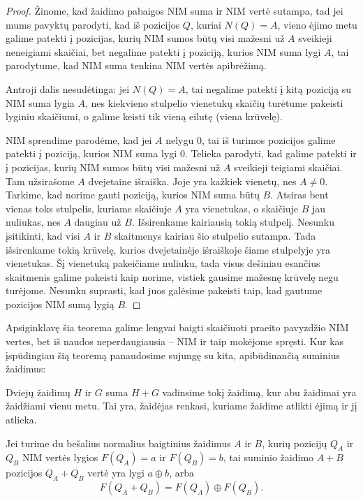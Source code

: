\begin{proof}
  Žinome, kad žaidimo pabaigos NIM suma ir NIM vertė sutampa, tad jei mums
  pavyktų parodyti, kad iš pozicijos $Q$, kuriai $N(Q)=A$, vieno ėjimo metu
  galime patekti į pozicijas, kurių NIM sumos būtų visi mažesni už $A$
  sveikieji neneigiami skaičiai, bet negalime patekti į poziciją, kurios NIM
  suma lygi $A$, tai parodytume, kad NIM suma tenkina NIM vertės apibrėžimą.

  Antroji dalis nesudėtinga: jei $N(Q)=A$, tai negalime patekti į kitą
  poziciją su NIM suma lygia $A$, nes kiekvieno stulpelio vienetukų skaičių
  turėtume pakeisti lyginiu skaičiumi, o galime keisti tik vieną eilutę
  (viena krūvelę).

  NIM sprendime parodėme, kad jei $A$ nelygu $0$, tai iš turimos pozicijos galime
  patekti į poziciją, kurios NIM suma lygi $0$. Telieka parodyti, kad galime
  patekti ir į pozicijas, kurių NIM sumos būtų visi mažesni už $A$ sveikieji
  teigiami skaičiai. Tam užsirašome $A$ dvejetaine išraiška. Joje yra kažkiek
  vienetų, nes $A\neq 0$. Tarkime, kad norime gauti poziciją, kurios NIM suma
  būtų $B$. Atsiras bent vienas toks stulpelis, kuriame skaičiuje $A$ yra vienetukas,
  o skaičiuje $B$ jau nuliukas, nes $A$ daugiau už $B$. Išsirenkame
  kairiausią tokią stulpelį. Nesunku įsitikinti, kad visi $A$ ir $B$ skaitmenys
  kairiau šio stulpelio sutampa. Tada išsirenkame tokią krūvelę,
  kurios dvejetainėje išraiškoje šiame stulpelyje yra vienetukas. Šį vienetuką
  pakeičiame nuliuku, tada visus dešiniau esančius skaitmenis galime pakeisti
  kaip norime, vistiek gausime mažesnę krūvelę negu turėjome. Nesunku suprasti,
  kad juos galėsime pakeisti taip, kad gautume pozicijos NIM sumą lygią $B$.
\end{proof}

Apsiginklavę šia teorema galime lengvai baigti skaičiuoti praeito pavyzdžio
NIM vertes, bet iš naudos neperdaugiausia -- NIM ir taip mokėjome spręsti.
Kur kas įspūdingiau šią teoremą panaudosime sujungę su kita, apibūdinančią
suminius žaidimus:

\begin{api}
  Dviejų žaidimų $H$ ir $G$ suma $H+G$ vadinsime tokį žaidimą, kur abu
  žaidimai yra žaidžiami vienu metu. Tai yra, žaidėjas renkasi, kuriame
  žaidime atlikti ėjimą ir jį atlieka.  
\end{api}

\begin{thm}
  Jei turime du bešalius normalius baigtinius žaidimus $A$ ir $B$, kurių
  pozicijų $Q_A$ ir $Q_B$ NIM vertės lygios $F(Q_A)=a$ ir $F(Q_B)=b$, tai
  suminio žaidimo $A+B$ pozicijos $Q_A+Q_B$ vertė yra lygi $a \oplus b$,
  arba
  $$F(Q_A+Q_B)=F(Q_A) \oplus F(Q_B).$$
\end{thm}

